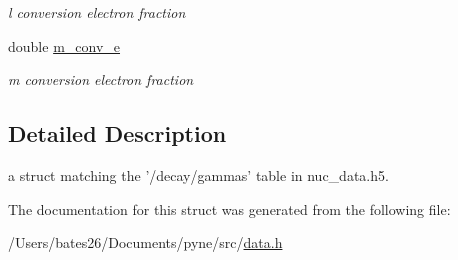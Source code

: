 \begin{DoxyCompactItemize}
\begin{DoxyCompactList}\small\item\em l conversion electron fraction \end{DoxyCompactList}\item 
\hypertarget{structpyne_1_1gamma_a6c664717050818947e2e79d75e914c41}{double \hyperlink{structpyne_1_1gamma_a6c664717050818947e2e79d75e914c41}{m\+\_\+conv\+\_\+e}}\label{structpyne_1_1gamma_a6c664717050818947e2e79d75e914c41}

\begin{DoxyCompactList}\small\item\em m conversion electron fraction \end{DoxyCompactList}\end{DoxyCompactItemize}


\subsection{Detailed Description}
a struct matching the '/decay/gammas' table in nuc\+\_\+data.\+h5. 

The documentation for this struct was generated from the following file\+:\begin{DoxyCompactItemize}
\item 
/\+Users/bates26/\+Documents/pyne/src/\hyperlink{data_8h}{data.\+h}\end{DoxyCompactItemize}
